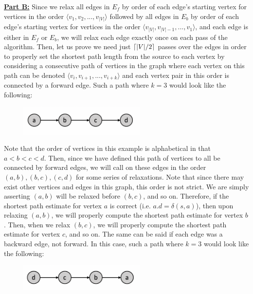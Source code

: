 \documentclass[11pt]{article}
\DeclarePairedDelimiter{\ceil}{\lceil}{\rceil}
\begin{document}
\underline{\textbf{Part B:}} Since we relax all edges in $E_f$ by order of each edge's starting vertex for vertices in the order $\langle v_1, v_2, ..., v_{|V|}\rangle$ followed by all edges in $E_b$ by order of each edge's starting vertex for vertices in the order $\langle v_{|V|}, v_{|V| - 1}, ..., v_{1}\rangle$, and each edge is either in $E_f$ or $E_b$, we will relax each edge exactly once on each pass of the algorithm. Then, let us prove we need just $\ceil{|V| / 2}$ passes over the edges in order to properly set the shortest path length from the source to each vertex by considering a consecutive path of vertices in the graph where each vertex on this path can be denoted $\langle v_{i}, v_{i+1}, ..., v_{i+k}\rangle$ and each vertex pair in this order is connected by a forward edge. Such a path where $k=3$ would look like the following:

\begin{figure}[ht]
    \includegraphics[width=2.5in]{prob3graph_forwards.png}
\end{figure}

Note that the order of vertices in this example is alphabetical in that $a < b < c < d$. Then, since we have defined this path of vertices to all be connected by forward edges, we will call  on these edges in the order $(a,b), (b,c), (c,d)$ for some series of relaxations. Note that since there may exist other vertices and edges in this graph, this order is not strict. We are simply asserting $(a,b)$ will be relaxed before $(b,c)$, and so on. Therefore, if the shortest path estimate for vertex $a$ is correct (i.e. $a.d = \delta(s,a)$), then upon relaxing $(a,b)$, we will properly compute the shortest path estimate for vertex $b$. Then, when we relax $(b,c)$, we will properly compute the shortest path estimate for vertex $c$, and so on. The same can be said if each edge was a backward edge, not forward. In this case, such a path where $k=3$ would look like the following:

\begin{figure}[ht]
    \includegraphics[width=2.5in]{prob3graph_backwards.png}
\end{figure}
\end{document}
